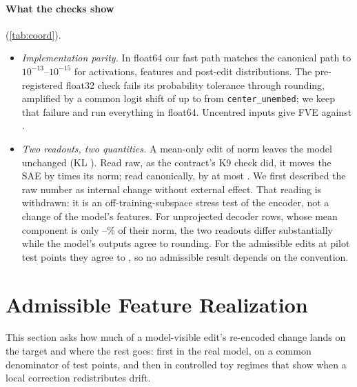 \documentclass{article}
\theoremstyle{plain}
\theoremstyle{definition}
\theoremstyle{remark}
\begin{document}
\paragraph{What the checks show} (\cref{tab:coord}).
\begin{itemize}
  \item \emph{Implementation parity.} In float64 our fast path matches the canonical path to
  $10^{-13}$--$10^{-15}$ for activations, features and post-edit distributions. The
  pre-registered float32 check fails its probability tolerance through rounding, amplified by
  a common logit shift of up to \CxShift{} from \texttt{center\_unembed}; we keep that failure
  and run everything in float64. Uncentred inputs give FVE \CxFVEUnc{} against \CxFVE.
  \item \emph{Two readouts, two quantities.} A mean-only edit of norm \CxRho{} leaves the model
  unchanged (KL \ClKLMax). Read raw, as the contract's K9 check did, it moves the SAE by
  \ClRawMed{} times its norm; read canonically, by at most \ClCanonMax. We first described
  the raw number as internal change without external effect. That reading is withdrawn: it
  is an off-training-subspace stress test of the encoder, not a change of the model's
  features. For unprojected decoder rows, whose mean component is only
  \CxEightMeanMin--\CxEightMeanMax\% of their norm, the two readouts differ substantially
  while the model's outputs agree to rounding. For the \ClRows{} admissible edits at \ClGroups{} pilot test
  points they agree to \ClAdmMax, so no admissible result depends on the convention.
\end{itemize}

\begin{table}[t]
  \caption{Raw off-slice versus canonical SAE readouts of the same edits, and what the model
  sees (float64). Contract windows: the 8 stored K9 cases, recomputed. Pilot points: 16 test
  points of the REAL-01R pilot, all stored values reproduced exactly. The full contract table
  is \cref{tab:contract-exec}.}
  \label{tab:coord}
  \centering
  \small
  \setlength{\tabcolsep}{4pt}
  
\end{table}

\section{Admissible Feature Realization}
\label{sec:fidelity}
This section asks how much of a model-visible edit's re-encoded change lands on the target
and where the rest goes: first in the real model, on a common denominator of test points,
and then in controlled toy regimes that show when a local correction redistributes drift.
\end{document}
